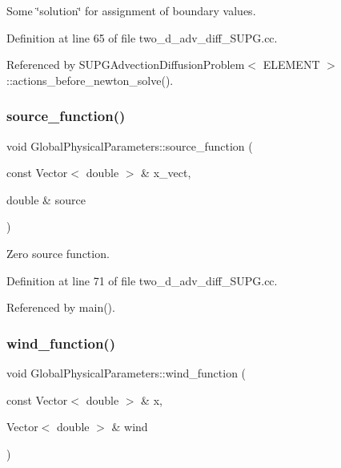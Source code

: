 Some \char`\"{}solution\char`\"{} for assignment of boundary values. 



Definition at line 65 of file two\+\_\+d\+\_\+adv\+\_\+diff\+\_\+\+S\+U\+P\+G.\+cc.



Referenced by S\+U\+P\+G\+Advection\+Diffusion\+Problem$<$ E\+L\+E\+M\+E\+N\+T $>$\+::actions\+\_\+before\+\_\+newton\+\_\+solve().

\mbox{\label{namespaceGlobalPhysicalParameters_aa84986d4d50cb043cc8fced56feab45f}} 
\subsubsection{\texorpdfstring{source\+\_\+function()}{source\_function()}}
{\footnotesize\ttfamily void Global\+Physical\+Parameters\+::source\+\_\+function (\begin{DoxyParamCaption}\item[{const Vector$<$ double $>$ \&}]{x\+\_\+vect,  }\item[{double \&}]{source }\end{DoxyParamCaption})}



Zero source function. 



Definition at line 71 of file two\+\_\+d\+\_\+adv\+\_\+diff\+\_\+\+S\+U\+P\+G.\+cc.



Referenced by main().

\mbox{\label{namespaceGlobalPhysicalParameters_a3a17e62bc0096244627f5f1a7f53c859}} 
\subsubsection{\texorpdfstring{wind\+\_\+function()}{wind\_function()}}
{\footnotesize\ttfamily void Global\+Physical\+Parameters\+::wind\+\_\+function (\begin{DoxyParamCaption}\item[{const Vector$<$ double $>$ \&}]{x,  }\item[{Vector$<$ double $>$ \&}]{wind }\end{DoxyParamCaption})}



